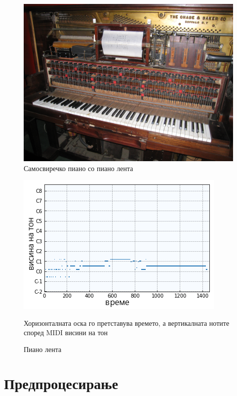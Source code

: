\begin{figure}[H]
	\centering
\includegraphics[scale=.3]{images/piano.jpeg}
	\caption{Самосвиречко пиано со пиано лента}
	\label{fig:piano_pr}
\end{figure}

\begin{figure}[H]
	\centering
\includegraphics[scale=1.3]{images/piano_roll.png}
	\caption{Пиано лента}
	Хоризонталната оска го претставува времето, а вертикалната нотите според MIDI висини на тон
	\label{fig:piano_roll}
\end{figure}

\section{Предпроцесирање}

